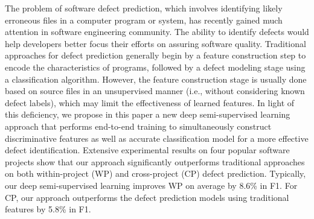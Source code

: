 The problem of software defect prediction, which involves identifying likely erroneous files in a computer program or system, has recently gained much attention in software engineering community. The ability to identify defects would help developers better focus their efforts on assuring software quality. Traditional approaches for defect prediction generally begin by a feature construction step to encode the characteristics of programs, followed by a defect modeling stage using a classification algorithm. However, the feature construction stage is usually done based on source files in an unsupervised manner (i.e., without considering known defect labels), which may limit the effectiveness of learned features. In light of this deficiency, we propose in this paper a new deep semi-supervised learning approach that performs end-to-end training to simultaneously construct discriminative features as well as accurate classification model for a more effective defect identification. Extensive experimental results on four popular software projects show that our approach significantly outperforms traditional approaches on both within-project (WP) and cross-project (CP) defect prediction. Typically, our deep semi-supervised learning improves WP on average by 8.6\% in F1. For CP, our approach outperforms the defect prediction models using traditional features by 5.8\% in F1.




